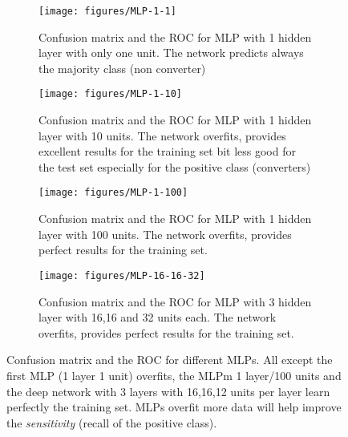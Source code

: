\documentclass[11pt]{article}
\theoremstyle{definition}
\theoremstyle{remark}
\begin{document}
\begin{figure}[H]
    \centering
    \begin{subfigure}[t]{1\textwidth}
        \centering
        \texttt{[image: figures/MLP-1-1]}
        \caption{Confusion matrix and the ROC for MLP with 1 hidden layer with only one unit. The network predicts always the majority class (non converter)}
    \end{subfigure}

    \begin{subfigure}[t]{1\textwidth}
        \centering
        \texttt{[image: figures/MLP-1-10]}
        \caption{Confusion matrix and the ROC for MLP with 1 hidden layer with 10 units. The network overfits, provides excellent results for the training set bit less good for the test set especially for the positive class (converters)}
    \end{subfigure}%

    \begin{subfigure}[t]{1\textwidth}
        \centering
        \texttt{[image: figures/MLP-1-100]}
        \caption{Confusion matrix and the ROC for MLP with 1 hidden layer with 100 units. The network overfits, provides perfect results for the training set.}
    \end{subfigure}%

    \begin{subfigure}[t]{1\textwidth}
        \centering
        \texttt{[image: figures/MLP-16-16-32]}
        \caption{Confusion matrix and the ROC for MLP with 3 hidden layer with 16,16 and 32 units each. The network overfits, provides perfect results for the training set.}
    \end{subfigure}%
    
    \caption{Confusion matrix and the ROC for different MLPs. All except the first MLP (1 layer 1 unit) overfits, the MLPm 1 layer/100 units and the deep network with 3 layers with 16,16,12 units per layer learn perfectly the training set. MLPs overfit more data will help improve the \emph{sensitivity} (recall of the positive class).} \label{fig:mlp_cm}
\end{figure}
\end{document}
